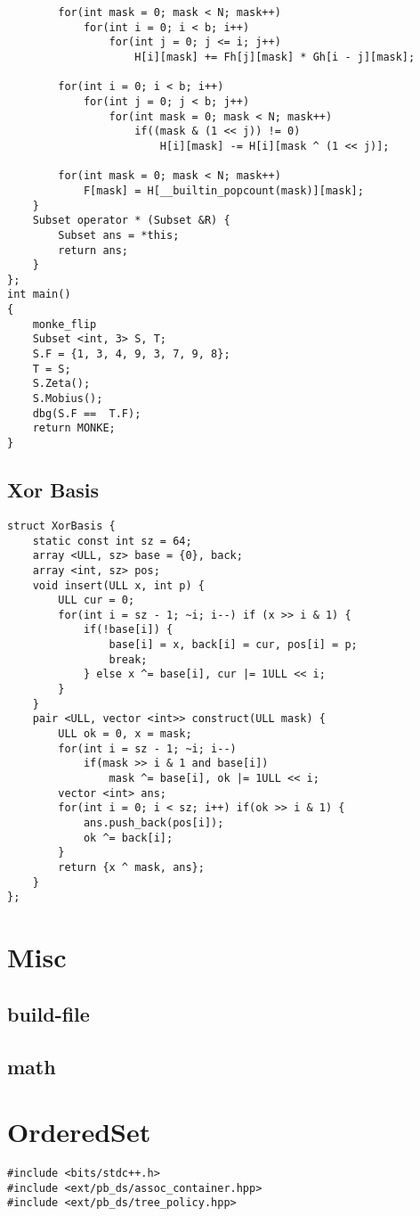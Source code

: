 \documentclass[FSZ,a4paper,onesided]{article}
\begin{document}
\begin{multicols*}{\COLS}
\begin{lstlisting}
        for(int mask = 0; mask < N; mask++)
            for(int i = 0; i < b; i++)
                for(int j = 0; j <= i; j++)
                    H[i][mask] += Fh[j][mask] * Gh[i - j][mask];

        for(int i = 0; i < b; i++) 
            for(int j = 0; j < b; j++) 
                for(int mask = 0; mask < N; mask++) 
                    if((mask & (1 << j)) != 0) 
                        H[i][mask] -= H[i][mask ^ (1 << j)];
                
        for(int mask = 0; mask < N; mask++)  
            F[mask] = H[__builtin_popcount(mask)][mask];
    }
    Subset operator * (Subset &R) {
        Subset ans = *this;
        return ans;
    }
};
int main()
{
    monke_flip
    Subset <int, 3> S, T;
    S.F = {1, 3, 4, 9, 3, 7, 9, 8};
    T = S;
    S.Zeta();
    S.Mobius();
    dbg(S.F ==  T.F);
    return MONKE;
}
\end{lstlisting}
\subsection{Xor Basis}
\begin{lstlisting}
struct XorBasis {
    static const int sz = 64;
    array <ULL, sz> base = {0}, back;
    array <int, sz> pos;
    void insert(ULL x, int p) {
        ULL cur = 0;
        for(int i = sz - 1; ~i; i--) if (x >> i & 1) {
            if(!base[i]) {
                base[i] = x, back[i] = cur, pos[i] = p;
                break;
            } else x ^= base[i], cur |= 1ULL << i;
        }
    }
    pair <ULL, vector <int>> construct(ULL mask) {
        ULL ok = 0, x = mask;
        for(int i = sz - 1; ~i; i--)  
            if(mask >> i & 1 and base[i])
                mask ^= base[i], ok |= 1ULL << i;
        vector <int> ans;
        for(int i = 0; i < sz; i++) if(ok >> i & 1) {
            ans.push_back(pos[i]);
            ok ^= back[i];
        }
        return {x ^ mask, ans};
    } 
};\end{lstlisting}
\section{Misc}
\subsection{build-file}
\subsection{math}
\section{OrderedSet}
\begin{lstlisting}
#include <bits/stdc++.h>
#include <ext/pb_ds/assoc_container.hpp>
#include <ext/pb_ds/tree_policy.hpp>


\end{lstlisting}
\end{multicols*}
\end{document}
